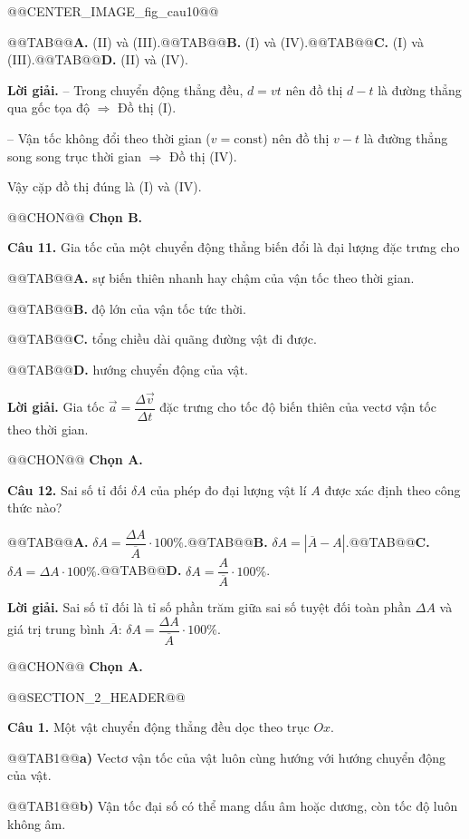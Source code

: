 \documentclass{article}
\begin{document}
@@CENTER_IMAGE_fig_cau10@@

@@TAB@@\textbf{A.} (II) và (III).@@TAB@@\textbf{B.} (I) và (IV).@@TAB@@\textbf{C.} (I) và (III).@@TAB@@\textbf{D.} (II) và (IV).

\textbf{Lời giải.} -- Trong chuyển động thẳng đều, $d = vt$ nên đồ thị $d - t$ là đường thẳng qua gốc tọa độ $\Rightarrow$ Đồ thị (I).

-- Vận tốc không đổi theo thời gian ($v = \text{const}$) nên đồ thị $v - t$ là đường thẳng song song trục thời gian $\Rightarrow$ Đồ thị (IV).

Vậy cặp đồ thị đúng là (I) và (IV).

@@CHON@@ \textbf{Chọn B.}

\textbf{Câu 11.} Gia tốc của một chuyển động thẳng biến đổi là đại lượng đặc trưng cho

@@TAB@@\textbf{A.} sự biến thiên nhanh hay chậm của vận tốc theo thời gian.

@@TAB@@\textbf{B.} độ lớn của vận tốc tức thời.

@@TAB@@\textbf{C.} tổng chiều dài quãng đường vật đi được.

@@TAB@@\textbf{D.} hướng chuyển động của vật.

\textbf{Lời giải.} Gia tốc $\vec{a} = \dfrac{\Delta \vec{v}}{\Delta t}$ đặc trưng cho tốc độ biến thiên của vectơ vận tốc theo thời gian.

@@CHON@@ \textbf{Chọn A.}

\textbf{Câu 12.} Sai số tỉ đối $\delta A$ của phép đo đại lượng vật lí $A$ được xác định theo công thức nào?

@@TAB@@\textbf{A.} $\delta A = \dfrac{\Delta A}{\overline{A}} \cdot 100\%$.@@TAB@@\textbf{B.} $\delta A = |\overline{A} - A|$.@@TAB@@\textbf{C.} $\delta A = \Delta A \cdot 100\%$.@@TAB@@\textbf{D.} $\delta A = \dfrac{A}{\overline{A}} \cdot 100\%$.

\textbf{Lời giải.} Sai số tỉ đối là tỉ số phần trăm giữa sai số tuyệt đối toàn phần $\Delta A$ và giá trị trung bình $\overline{A}$: $\delta A = \dfrac{\Delta A}{\overline{A}} \cdot 100\%$.

@@CHON@@ \textbf{Chọn A.}

@@SECTION_2_HEADER@@

\textbf{Câu 1.} Một vật chuyển động thẳng đều dọc theo trục $Ox$.

@@TAB1@@\textbf{a)} Vectơ vận tốc của vật luôn cùng hướng với hướng chuyển động của vật.

@@TAB1@@\textbf{b)} Vận tốc đại số có thể mang dấu âm hoặc dương, còn tốc độ luôn không âm.
\end{document}
